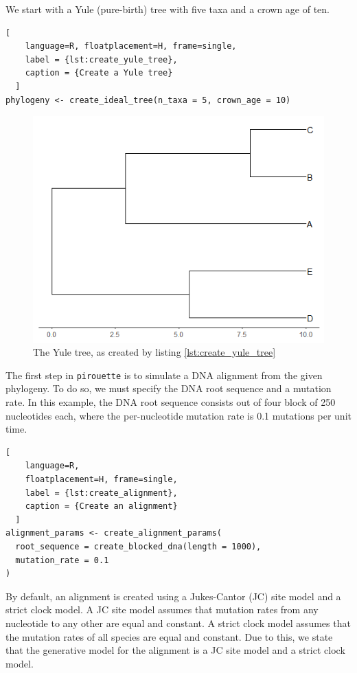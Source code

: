 \documentclass{article}
\begin{document}
We start with a Yule (pure-birth) tree with five taxa and a crown age of ten.

\begin{lstlisting}[
    language=R, floatplacement=H, frame=single, 
    label = {lst:create_yule_tree}, 
    caption = {Create a Yule tree}
  ]
phylogeny <- create_ideal_tree(n_taxa = 5, crown_age = 10)
\end{lstlisting}

\begin{figure}[h]
  \includegraphics[width=\textwidth]{figure_bd.png}
  \caption{The Yule tree, as created by listing \ref{lst:create_yule_tree}}
\end{figure}

The first step in \verb;pirouette; is to simulate a DNA alignment from the given phylogeny. 
To do so, we must specify the DNA root sequence and a mutation rate. 
In this example, the DNA root sequence consists out of four block of 250 nucleotides each, 
where the per-nucleotide mutation rate is 0.1 mutations per unit time.

\begin{lstlisting}[
    language=R,
    floatplacement=H, frame=single,
    label = {lst:create_alignment}, 
    caption = {Create an alignment}
  ]
alignment_params <- create_alignment_params(
  root_sequence = create_blocked_dna(length = 1000),
  mutation_rate = 0.1
)
\end{lstlisting}

By default, an alignment is created using a Jukes-Cantor (JC) site model
and a strict clock model. A JC site model assumes that mutation rates from any nucleotide to any other are equal and constant. A strict clock model assumes that the mutation rates of all species are equal and constant.
Due to this, we state that the generative model for the alignment is
a JC site model and a strict clock model.
\end{document}
